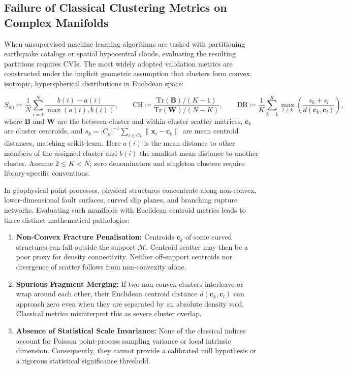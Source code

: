 \subsection{Failure of Classical Clustering Metrics on Complex Manifolds}
\label{subsec:classical_metrics_failure}

When unsupervised machine learning algorithms are tasked with
partitioning earthquake catalogs or spatial hypocentral clouds,
evaluating the resulting partitions requires \acp{CVI}. The most widely adopted
validation metrics 
are constructed under the implicit geometric assumption that
clusters form convex, isotropic, hyperspherical distributions in
Euclidean space:

\begin{equation}
  S_{\mathrm{Sil}} \coloneqq \frac{1}{N}\sum_{i=1}^N \frac{b(i) -
  a(i)}{\max(a(i), b(i))}, \qquad
  \mathrm{CH} \coloneqq \frac{\mathrm{Tr}(\mathbf{B})/(K -
  1)}{\mathrm{Tr}(\mathbf{W})/(N - K)}, \qquad
  \mathrm{DB} \coloneqq \frac{1}{K}\sum_{k=1}^K \max_{l \ne k} \left(
  \frac{s_k + s_l}{d(\mathbf{c}_k, \mathbf{c}_l)} \right),
  \label{eq:classical_cvis}
\end{equation}
where $\mathbf{B}$ and $\mathbf{W}$ are the between-cluster and
within-cluster scatter matrices, $\mathbf{c}_k$ are cluster
centroids, and $s_k=|C_k|^{-1}\sum_{i\in C_k}\|\mathbf{x}_i-\mathbf{c}_k\|$
are mean centroid distances, matching scikit-learn. Here $a(i)$ is the
mean distance to other members of the assigned cluster and $b(i)$ the
smallest mean distance to another cluster. Assume $2\le K<N$;
zero denominators and singleton clusters require library-specific conventions.

In geophysical point processes, physical structures concentrate
along non-convex, lower-dimensional fault surfaces, curved slip
planes, and branching rupture networks. Evaluating such manifolds
with Euclidean centroid metrics leads to three distinct mathematical
pathologies:
\begin{enumerate}[noitemsep,topsep=2pt]
  \item \textbf{Non-Convex Fracture Penalisation:} Centroids
    $\mathbf{c}_k$ of some curved structures can fall outside
    the support $\mathcal{M}$. Centroid scatter may then be a poor
    proxy for density connectivity. Neither off-support centroids
    nor divergence of scatter follows from non-convexity alone.
  \item \textbf{Spurious Fragment Merging:} If two non-convex
    clusters interleave or wrap around each other, their Euclidean
    centroid distance $d(\mathbf{c}_k, \mathbf{c}_l)$ can approach
    zero even when they are separated by an absolute density void.
    Classical metrics misinterpret this as severe cluster overlap.
  \item \textbf{Absence of Statistical Scale Invariance:} None of
    the classical indices account for Poisson point-process sampling
    variance or local intrinsic dimension. Consequently, they cannot
    provide a calibrated null hypothesis or a rigorous statistical
    significance threshold.
\end{enumerate}


